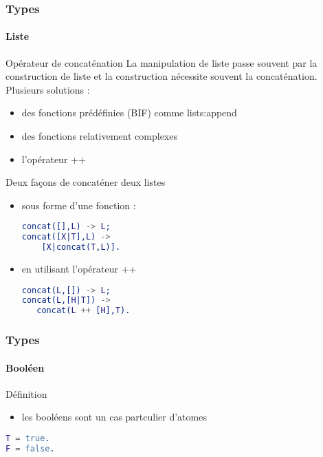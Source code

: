 \begin{frame}[fragile]
  \frametitle{Types}
  \framesubtitle{Liste}

  \begin{block}{Opérateur de concaténation}
    La manipulation de liste passe souvent par la construction de liste et
    la construction nécessite souvent la concaténation. Plusieurs solutions :
    \begin{itemize}
    \item des fonctions prédéfinies (BIF) comme lists:append
    \item des fonctions relativement complexes
    \item l'opérateur ++
    \end{itemize}
  \end{block}

  \begin{exampleblock}{Deux façons de concaténer deux listes}
    \begin{itemize}
    \item sous forme d'une fonction :
      \begin{lstlisting}[language=erlang]
concat([],L) -> L;
concat([X|T],L) ->
    [X|concat(T,L)].
      \end{lstlisting}
    \item en utilisant l'opérateur ++
      \begin{lstlisting}[language=erlang]
concat(L,[]) -> L;
concat(L,[H|T]) ->
   concat(L ++ [H],T).
      \end{lstlisting}
    \end{itemize}
  \end{exampleblock}

\end{frame}



\begin{frame}[fragile]
  \frametitle{Types}
  \framesubtitle{Booléen}

  \begin{block}{Définition}
    \begin{itemize}
      \item les booléens sont un cas partculier d'atomes
    \end{itemize}
    \begin{lstlisting}[language=erlang]
T = true.
F = false.
    \end{lstlisting}
  \end{block}

\end{frame}

